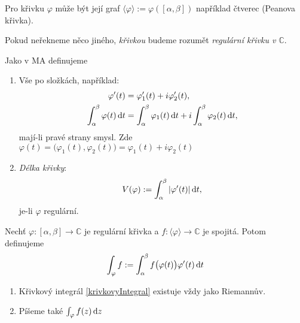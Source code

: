\begin{note}
Pro křivku $\varphi$ může být její graf $\langle\varphi\rangle:=\varphi([\alpha,\beta])$ například čtverec (Peanova křivka).
\end{note}

\begin{agreement}
Pokud neřekneme něco jiného, \emph{křivkou} budeme rozumět \emph{regulární křivku v $\mathbb{C}$}. %
\end{agreement}

\begin{reminder}
Jako v MA definujeme
\begin{enumerate}
    \item Vše po složkách, například:
    \begin{align*}
        \varphi'(t)&=\varphi'_1(t)+i\varphi'_2(t),\\
        \int_\alpha^\beta\varphi(t)\mathop{}\!\mathrm{d} t &=\int_\alpha^\beta\varphi_1(t)\mathop{}\!\mathrm{d} t +i\int_\alpha^\beta\varphi_2(t)\mathop{}\!\mathrm{d} t,
    \end{align*}
    mají-li pravé strany smysl. Zde $\varphi(t)=\big(\varphi_1(t),\varphi_2(t)\big)=\varphi_1(t)+i\varphi_2(t)$
    \item \emph{Délka křivky}: \[V(\varphi):=\int_\alpha^\beta|\varphi'(t)|\mathop{}\!\mathrm{d} t,\] je-li $\varphi$ regulární.
\end{enumerate}
\end{reminder}
\begin{definition}
Nechť $\varphi:[\alpha,\beta]\rightarrow\mathbb{C}$ je regulární křivka a $f:\langle\varphi\rangle\rightarrow\mathbb{C}$ je spojitá. Potom definujeme
\begin{equation}\label{krivkovyIntegral}
    \int_\varphi f:=\int_\alpha^\beta f\big(\varphi(t)\big)\varphi'(t)\mathop{}\!\mathrm{d} t
\end{equation}
\end{definition}
\begin{note}
\mbox{} %
\begin{enumerate}
    \item Křivkový integrál \cref{krivkovyIntegral} existuje vždy jako Riemannův.
    \item Píšeme také $\int_\varphi f(z)\mathop{}\!\mathrm{d} z$%
\end{enumerate}
\end{note}
\newpage
